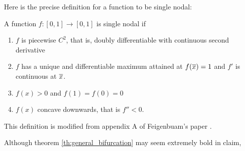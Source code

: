 Here is the precise definition for a function to be single nodal:


\begin{defn}
	A function $f: [0,1] \rightarrow [0,1]$ is single nodal if 
	\begin{enumerate}
		\item $f$ is piecewise $C^2$, that is, doubly differentiable with continuous second derivative
		\item $f$ has a unique and differentiable maximum attained at $f(\overline{x}) = 1$ and $f'$ is continuous at $\overline{x}$.
		\item $f(x) > 0$ and $f(1) = f(0) =0$
		\item $f(x)$ concave downwards, that is $f'' < 0$.
	\end{enumerate}

	This definition is modified from appendix A of Feigenbuam's paper \cite{F1}.
\end{defn}

Although theorem \ref{th:general_bifurcation} may seem extremely bold in claim, 
